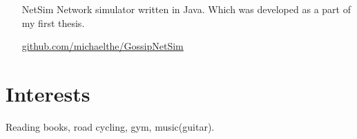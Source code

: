 \documentclass[margin, 10pt]{res} %
\begin{document}
\begin{resume}
\begin{itemize}
\item[NetSim] Network simulator written in Java.
Which was developed as a part of my first thesis.

\href{https://github.com/michaelthe/GossipNetSim}{github.com/michaelthe/GossipNetSim}

\end{itemize}

\section{Interests}

Reading books, road cycling, gym, music(guitar).

\end{resume}
\end{document}

